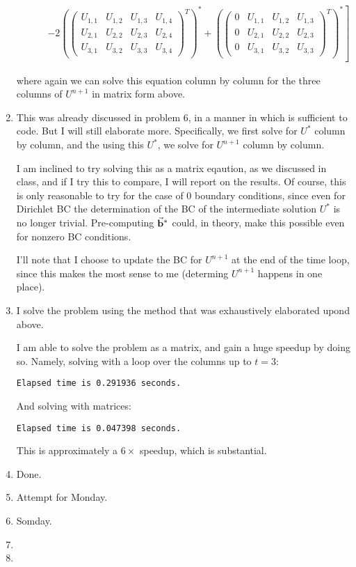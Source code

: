 \documentclass[11pt]{article}
\newcommand{\bvec}[1]{\vec{ {\bf #1 } }}
\begin{document}
\begin{enumerate}
\begin{align*}
& ~~~~~~~~~\left. -2\left ( \left ( \begin{array}{cccc} U_{1,1} & U_{1,2} & U_{1,3} & U_{1,4 }\\ U_{2,1} & U_{2,2} & U_{2,3} & U_{2,4 } \\ U_{3,1} & U_{3,2} & U_{3,3} & U_{3,4 }  \end{array} \right ) ^T \right ) ^{*} + \left ( \left ( \begin{array}{cccc} 0 & U_{1,1} & U_{1,2} & U_{1,3 }\\ 0 & U_{2,1} & U_{2,2} & U_{2,3 } \\ 0 & U_{3,1} & U_{3,2} & U_{3,3 }  \end{array} \right ) ^T \right ) ^{*} \right ]\end{align*}

where again we can solve this equation column by column for the three columns of $U^{n+1}$ in matrix form above.

\item This was already discussed in problem 6, in a manner in which is sufficient to code.
But I will still elaborate more.
Specifically, we first solve for $U ^*$ column by column, and the using this $U^*$, we solve for $U ^{n+1}$ column by column.

I am inclined to try solving this as a matrix eqaution, as we discussed in class, and if I try this to compare, I will report on the results.
Of course, this is only reasonable to try for the case of 0 boundary conditions, since even for Dirichlet BC the determination of the BC of the intermediate solution $U^*$ is no longer trivial.
Pre-computing $\bvec{b}^*$ could, in theory, make this possible even for nonzero BC conditions.

I'll note that I choose to update the BC for $U^{n+1}$ at the end of the time loop, since this makes the most sense to me (determing $U^{n+1}$ happens in one place).

\item I solve the problem using the method that was exhaustively elaborated upond above.

I am able to solve the problem as a matrix, and gain a huge speedup by doing so.
Namely, solving with a loop over the columns up to $t=3$:

\verb|Elapsed time is 0.291936 seconds.|

And solving with matrices:

\verb|Elapsed time is 0.047398 seconds.|

This is approximately a $6\times$ speedup, which is substantial.

\item Done.

\item Attempt for Monday.

\item Somday.

\item

\item

\end{enumerate}
\end{document}
